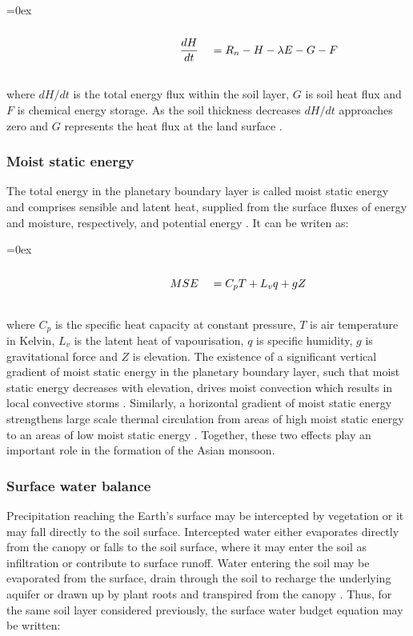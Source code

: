 \documentclass{icldt}\usepackage[]{graphicx}\usepackage[]{color}
\def\leftalgn{0.45}\def\rightalgn{0.45}
\def\algnrow{\rule{\leftalgn\textwidth}{0ex}&\rule{\rightalgn\textwidth}{0ex}}
\newenvironment{algneqn}{%
  \arraycolsep=0ex\renewcommand\arraystretch{0}%
  \begin{equation}%
  \begin{array}{rl}%
  \algnrow\\}%
 {\\\algnrow%
  \end{array}%
  \end{equation}\ignorespacesafterend%
}
\begin{document}
\begin{algneqn} \label{eq:energybudget}
\dfrac{dH}{dt}\ &= R_{n} - H - \lambda E - G - F
\end{algneqn} 

\noindent where $ dH / dt $ is the total energy flux within the soil layer, $ G $ is soil heat flux and $ F $ is chemical energy storage. As the soil thickness decreases $ dH / dt $ approaches zero and $ G $ represents the heat flux at the land surface \citep{Seneviratne2010}. \\

\subsubsection{Moist static energy}

The total energy in the planetary boundary layer is called moist static energy and comprises sensible and latent heat, supplied from the surface fluxes of energy and moisture, respectively, and potential energy \citep{Eltahir1998,Prive2007a}. It can be writen as:

\begin{algneqn} \label{eq:mse}
MSE\ &= C_{p}T + L_{v}q + gZ
\end{algneqn}

\noindent where $ C_{p} $ is the specific heat capacity at constant pressure, $ T $ is air temperature in Kelvin, $ L_{v} $ is the latent heat of vapourisation, $ q $ is specific humidity, $ g $ is gravitational force and $ Z $ is elevation. The existence of a significant vertical gradient of moist static energy in the planetary boundary layer, such that moist static energy decreases with elevation, drives moist convection which results in local convective storms \citep{Eltahir1998,Neelin2007,Barry2010}. Similarly, a horizontal gradient of moist static energy strengthens large scale thermal circulation from areas of high moist static energy to an areas of low moist static energy \citep{Eltahir1998,Zheng1998}. Together, these two effects play an important role in the formation of the Asian monsoon. \\

\subsubsection{Surface water balance}

Precipitation reaching the Earth's surface may be intercepted by vegetation or it may fall directly to the soil surface. Intercepted water either evaporates directly from the canopy or falls to the soil surface, where it may enter the soil as infiltration or contribute to surface runoff. Water entering the soil may be evaporated from the surface, drain through the soil to recharge the underlying aquifer or drawn up by plant roots and transpired from the canopy \citep{Pitman2003}. Thus, for the same soil layer considered previously, the surface water budget equation may be written:
\end{document}
